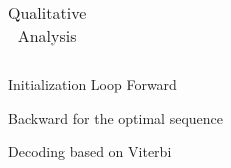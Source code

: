 \documentclass[11pt,a4paper]{article}
\begin{document}
\begin{table*}[t!]
{\begin{tabular}{ c  c c c   }
			

















			

















			

















			













\bottomrule
      \end{tabular}
      }
      \centering
\caption{Qualitative Analysis}
      \label{tab:qualitative2}
\end{table*}

\begin{algorithm}[H]
\SetAlgoLined
Initialization\;
\For{}{
\For{ }
{ \; \\
}
\For{ }{
    \For{}{
        \For{}{
            \For{}{
            \;\\
            {}}}}}
}
Loop Forward\;
\For{}{
\For{ }
{\; \\
 \\
}

\For{ }{
    \For{}{
        \For{}{
            \For{}{
            \;\\
            {}}}}}
}


Backward for the optimal sequence \;
\For{} {
\If{}{}
\Else{}
}
\caption{Decoding based on Viterbi}
\end{algorithm}
\end{document}
